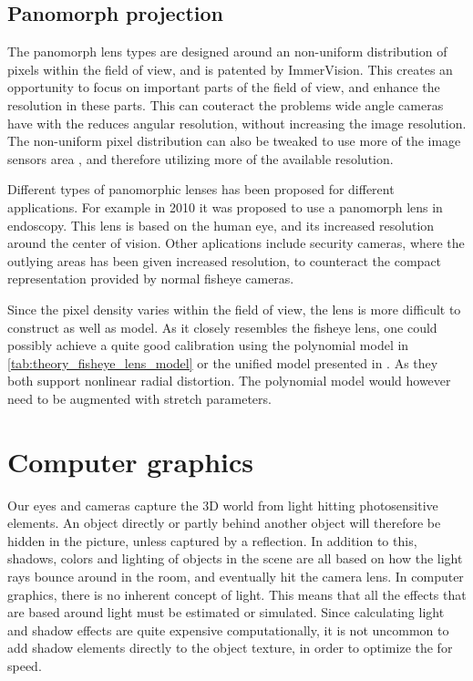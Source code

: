\subsection{Panomorph projection}

The panomorph lens types are designed around an non-uniform distribution of pixels within the field of view, and is patented by ImmerVision. This creates an opportunity to focus on important parts of the field of view, and enhance the resolution in these parts. This can couteract the problems wide angle cameras have with the reduces angular resolution, without increasing the image resolution. The non-uniform pixel distribution can also be tweaked to use more of the image sensors area \cite{PanomorphLowCostSurvailance}, and therefore utilizing more of the available resolution.

Different types of panomorphic lenses has been proposed for different applications. For example in 2010 it was proposed to use a panomorph lens in endoscopy\cite{endoscopypano}. This lens is based on the human eye, and its increased resolution around the center of vision. Other aplications include security cameras\cite{PanomorphEnhancesSurvailance}, where the outlying areas has been given increased resolution, to counteract the compact representation provided by normal fisheye cameras.

Since the pixel density varies within the field of view, the lens is more difficult to construct as well as model. As it closely resembles the fisheye lens, one could possibly achieve a quite good calibration using the polynomial model in \ref{tab:theory_fisheye_lens_model} or the unified model presented in \cite{FisheyeKalibration}. As they both support nonlinear radial distortion. The polynomial model would however need to be augmented with stretch parameters.

\section{Computer graphics}

Our eyes and cameras capture the 3D world from light hitting photosensitive elements. An object directly or partly behind another object will therefore be hidden in the picture, unless captured by a reflection. In addition to this, shadows, colors and lighting of objects in the scene are all based on how the light rays bounce around in the room, and eventually hit the camera lens. In computer graphics, there is no inherent concept of light. This means that all the effects that are based around light must be estimated or simulated. Since calculating light and shadow effects are quite expensive computationally, it is not uncommon to add shadow elements directly to the object texture, in order to optimize the for speed.


